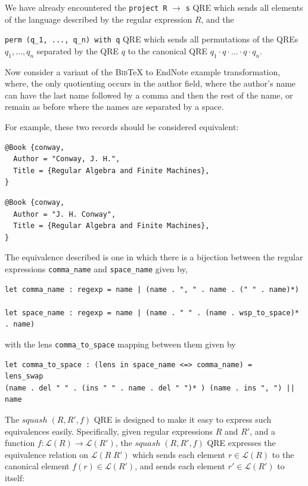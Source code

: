 \documentclass{svproc}
\newcommand{\cd}[1]{\lstinline[backgroundcolor=\color{white}]$#1$}
\newcommand{\squash}[3]{\ensuremath{\mathit{squash} \; (#1, #2, #3)}}
\newcommand{\bibtex}{\textsc{Bib}\TeX{}}
\begin{document}
We have already encountered the \cd{project R} $\to$ \cd{s} QRE
which sends all elements of the language described by the regular expression
$R$, and the

\noindent \cd{perm (q_1, ..., q_n) with q} QRE which sends all permutations of
the QREs $q_1, \ldots, q_n$ separated by the QRE $q$ to the canonical
QRE $q_1 \cdot q \cdot \ldots \cdot q \cdot q_n$.

Now consider a variant of the \bibtex{} to EndNote example transformation,
where, the only quotienting occurs in the author field, where the author's name
can have the last name followed by a comma and then the rest of the name, or
remain as before where the names are separated by a space.

For example, these two records should be considered equivalent:
\begin{verbatim}
@Book {conway,
  Author = "Conway, J. H.",
  Title = {Regular Algebra and Finite Machines},
}
\end{verbatim}
\begin{verbatim}
@Book {conway,
  Author = "J. H. Conway",
  Title = {Regular Algebra and Finite Machines},
}
\end{verbatim}

The equivalence described is one in which there is a bijection between 
the regular expressions \cd{comma_name} and \cd{space_name} given by,
\begin{lstlisting}
let comma_name : regexp = name | (name . ", " . name . (" " . name)*)

let space_name : regexp = name | (name . " " . (name . wsp_to_space)* . name)

\end{lstlisting}

\noindent with the lens \cd{comma_to_space} mapping between them given by 
\begin{lstlisting}
let comma_to_space : (lens in space_name <=> comma_name) =
lens_swap 
(name . del " " . (ins " " . name . del " ")* ) (name . ins ", ") || name 
\end{lstlisting}

The $\squash{R}{R'}{f}$ QRE is designed to make it easy to express such
equivalences easily. Specifically, given regular expressions $R$ and $R'$, and
a function $f : \mathcal{L}(R) \longrightarrow \mathcal{L}(R')$, the
$\squash{R}{R'}{f}$ QRE expresses the equivalence relation on $\mathcal{L}(R \;
R')$ which sends each element $r \in \mathcal{L}(R)$ to the canonical element
$f(r) \in \mathcal{L}(R')$, and sends each element $r' \in \mathcal{L}(R')$ to
itself:
\end{document}
